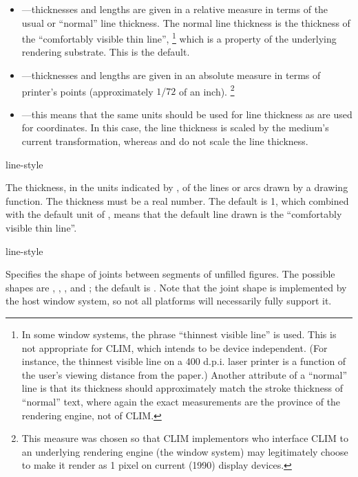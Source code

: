 \begin{itemize}
\item {}---thicknesses and lengths are given in a relative measure in
terms of the usual or ``normal'' line thickness.  The normal line thickness is
the thickness of the ``comfortably visible thin line'',
\footnote{In some window systems, the phrase ``thinnest
visible line'' is used.  This is not appropriate for CLIM, which intends to be
device independent.  (For instance, the thinnest visible line on a 400 d.p.i.
laser printer is a function of the user's viewing distance from the paper.)
Another attribute of a ``normal'' line is that its thickness should
approximately match the stroke thickness of ``normal'' text, where again the
exact measurements are the province of the rendering engine, not of CLIM.}
which is a property of the underlying rendering substrate.  This is the default. 

\item {}---thicknesses and lengths are given in an absolute measure in
terms of printer's points (approximately $1/72$ of an inch).
\footnote{This measure was chosen so that CLIM implementors who interface CLIM
to an underlying rendering engine (the window system) may legitimately choose to
make it render as 1 pixel on current (1990) display devices.}

\item {}---this means that the same units should be used for line
thickness as are used for coordinates.  In this case, the line thickness is
scaled by the medium's current transformation, whereas  and
 do not scale the line thickness.
\end{itemize}


 {line-style}

The thickness, in the units indicated by , of the lines or
arcs drawn by a drawing function.  The thickness must be a real number.  The
default is 1, which combined with the default unit of , means that
the default line drawn is the ``comfortably visible thin line''.

 {line-style}

Specifies the shape of joints between segments of unfilled figures.  The
possible shapes are , , , and ; the
default is .  Note that the joint shape is implemented by the host
window system, so not all platforms will necessarily fully support it.

